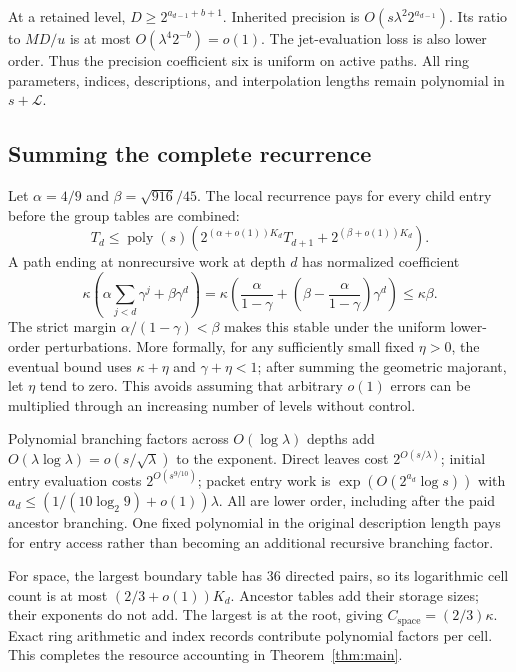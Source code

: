 \documentclass[11pt,letterpaper]{article}
\theoremstyle{remark}\newtheorem{remark}[theorem]{Remark}
\newcommand{\poly}{\operatorname{poly}}
\newcommand{\CS}{C_{\mathrm{space}}}
\begin{document}
At a retained level, $D\ge2^{a_{d-1}+b+1}$. Inherited precision is
$O(s\lambda^2 2^{a_{d-1}})$. Its ratio to $MD/u$ is at most
$O(\lambda^4 2^{-b})=o(1)$. The jet-evaluation loss is also lower order.
Thus the precision coefficient six is uniform on active paths. All ring
parameters, indices, descriptions, and interpolation lengths remain
polynomial in $s+\mathcal L$.

\subsection{Summing the complete recurrence}

Let $\alpha=4/9$ and $\beta=\sqrt{916}/45$. The local recurrence pays for
every child entry before the group tables are combined:
\[
 T_d\le\poly(s)\left(2^{(\alpha+o(1))K_d}T_{d+1}
                    +2^{(\beta+o(1))K_d}\right).
\]
A path ending at nonrecursive work at depth $d$ has normalized coefficient
\[
 \kappa\left(\alpha\sum_{j<d}\gamma^j+\beta\gamma^d\right)
 =\kappa\left(\frac\alpha{1-\gamma}
       +\left(\beta-\frac\alpha{1-\gamma}\right)\gamma^d\right)
 \le\kappa\beta.
\]
The strict margin $\alpha/(1-\gamma)<\beta$ makes this stable under the
uniform lower-order perturbations. More formally, for any sufficiently
small fixed $\eta>0$, the eventual bound uses $\kappa+\eta$ and
$\gamma+\eta<1$; after summing the geometric majorant, let $\eta$ tend
to zero. This avoids assuming that arbitrary $o(1)$ errors can be multiplied
through an increasing number of levels without control.

Polynomial branching factors across $O(\log\lambda)$ depths add
$O(\lambda\log\lambda)=o(s/\sqrt\lambda)$ to the exponent. Direct leaves
cost $2^{O(s/\lambda)}$; initial entry evaluation costs $2^{O(s^{9/10})}$;
packet entry work is $\exp(O(2^{a_d}\log s))$ with
$a_d\le(1/(10\log_2 9)+o(1))\lambda$. All are lower order, including
after the paid ancestor branching. One fixed polynomial in the original
description length pays for entry access rather than becoming an
additional recursive branching factor.

For space, the largest boundary table has 36 directed pairs, so its
logarithmic cell count is at most $(2/3+o(1))K_d$. Ancestor tables add
their storage sizes; their exponents do not add. The largest is at the
root, giving $\CS=(2/3)\kappa$. Exact ring arithmetic and index records
contribute polynomial factors per cell. This completes the resource
accounting in Theorem~\ref{thm:main}.


\end{document}
